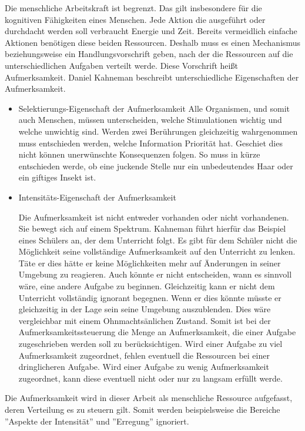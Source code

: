 \documentclass{llncs}					%
\begin{document}
Die menschliche Arbeitskraft ist begrenzt. Das gilt insbesondere für die kognitiven Fähigkeiten eines Menschen. Jede Aktion die ausgeführt oder durchdacht werden soll verbraucht Energie und Zeit. Bereits vermeidlich einfache Aktionen benötigen diese beiden Ressourcen. Deshalb muss es einen Mechanismus beziehungsweise ein Handlungsvorschrift geben, nach der die Ressourcen auf die unterschiedlichen Aufgaben verteilt werde. Diese Vorschrift heißt Aufmerksamkeit.
 Daniel Kahneman \cite{kahneman1973attention} beschreibt unterschiedliche Eigenschaften der Aufmerksamkeit.
 \begin{itemize}
 	\item Selektierungs-Eigenschaft der Aufmerksamkeit
 	Alle Organismen, und somit auch Menschen, müssen unterscheiden, welche Stimulationen wichtig und welche unwichtig sind. Werden zwei Berührungen gleichzeitig wahrgenommen muss entschieden werden, welche Information Priorität hat. Geschiet dies nicht können unerwünschte Konsequenzen folgen. So muss in kürze entschieden werde, ob eine juckende Stelle nur ein unbedeutendes Haar oder ein giftiges Insekt ist. 
 	
 	\item Intensitäts-Eigenschaft der Aufmerksamkeit
 	
 	Die Aufmerksamkeit ist nicht entweder vorhanden oder nicht vorhandenen. Sie bewegt sich auf einem Spektrum.
 	Kahneman\cite{kahneman1973attention} führt hierfür das Beispiel eines Schülers an, der dem Unterricht folgt. Es gibt für dem Schüler nicht die Möglichkeit seine vollständige Aufmerksamkeit auf den Unterricht zu lenken. Täte er dies hätte er keine Möglichkeiten mehr auf Änderungen in seiner Umgebung zu reagieren. Auch könnte er nicht entscheiden, wann es sinnvoll wäre, eine andere Aufgabe zu beginnen. Gleichzeitig kann er nicht dem Unterricht vollständig ignorant begegnen. Wenn er dies könnte müsste er gleichzeitig in der Lage sein seine Umgebung auszublenden. Dies wäre vergleichbar mit einem Ohnmachtsänlichen Zustand.
 	Somit ist bei der Aufmerksamkeitssteuerung die Menge an Aufmerksamkeit, die einer Aufgabe zugeschrieben werden soll zu berücksichtigen. Wird einer Aufgabe zu viel Aufmerksamkeit zugeordnet, fehlen eventuell die Ressourcen bei einer dringlicheren Aufgabe. Wird einer Aufgabe zu wenig Aufmerksamkeit zugeordnet, kann diese eventuell nicht oder nur zu langsam erfüllt werde.
 	
 \end{itemize}
Die Aufmerksamkeit wird in dieser Arbeit als menschliche Ressource aufgefasst, deren Verteilung es zu steuern gilt. Somit werden beispielsweise die Bereiche ''Aspekte der Intensität''\cite{kahneman1973attention} und ''Erregung''\cite{kahneman1973attention} ignoriert.
\end{document}
